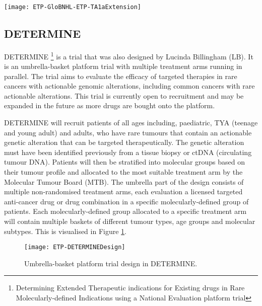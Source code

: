 \begin{sidewaysfigure}[h!]
	\centering
	\caption{ETP for the expansion stage of treatment arm \RN{1}a in Glo-BNHL.}
	\label{fig_etp:GloBNHL-ETP-TA1aExtenstion}
	\texttt{[image: ETP-GloBNHL-ETP-TA1aExtension]}
\end{sidewaysfigure} 

\clearpage


\subsection{DETERMINE}

DETERMINE \footnote{Determining Extended Therapeutic indications for Existing drugs in Rare Molecularly-defined Indications using a National Evaluation platform trial} is a trial that was also designed by Lucinda Billingham (LB). It is an umbrella-basket platform trial with multiple treatment arms running in parallel. The trial aims to evaluate the efficacy of targeted therapies in rare cancers with actionable genomic alterations, including common cancers with rare actionable alterations. This trial is currently open to recruitment and may be expanded in the future as more drugs are bought onto the platform.  

DETERMINE will recruit patients of all ages including, paediatric, TYA (teenage and young adult) and adults, who have rare tumours that contain an actionable genetic alteration that can be targeted therapeutically. The genetic alteration must have been identified previously from a tissue biopsy or ctDNA (circulating tumour DNA). Patients will then be stratified into molecular groups based on their tumour profile and allocated to the most suitable treatment arm by the Molecular Tumour Board (MTB). The umbrella part of the design consists of multiple non-randomised treatment arms, each evaluation a licensed targeted anti-cancer drug or drug combination in a specific molecularly-defined group of patients. Each molecularly-defined group allocated to a specific treatment arm will contain multiple baskets of different tumour types, age groups and molecular subtypes. This is visualised in Figure \ref{fig_etp:DETERMINEDesign}. 

\begin{figure}[h!]
	\centering
	\caption{Umbrella-basket platform trial design in DETERMINE.}
	\label{fig_etp:DETERMINEDesign}
	\texttt{[image: ETP-DETERMINEDesign]}
\end{figure}

